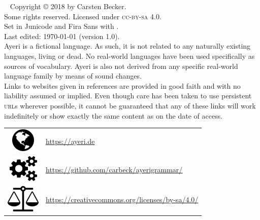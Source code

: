~\vfill
\begingroup
\setlength\parindent{0pt}\footnotesize
Copyright © 2018 by Carsten Becker.\\
Some rights reserved. Licensed under \textsc{cc-by-sa} 4.0.\\

Set in Junicode and {\sffamily Fira Sans} with \XeLaTeX{}.\\
Last edited: \today{} (version 1.0).\\

Ayeri is a fictional language. As such, it is not related to any naturally
existing languages, living or dead. No real-world languages have been used
specifically as sources of vocabulary. Ayeri is also not derived from any
specific real-world language family by means of sound changes.\\

Links to websites given in references are provided in good faith and with no
liability assumed or implied. Even though care has been taken to use persistent
\textsc{url}s wherever possible, it cannot be guaranteed that any of these
links will work indefinitely or show exactly the same content as on the date of
access.\\

\begin{tabular}{@{} c @{\enspace} l}
\includegraphics[scale=.8]{images/faicon-globe-300dpi.png}
& \href{https://ayeri.de}{https://ayeri.de}\\
\includegraphics[scale=.8]{images/faicon-cogs-300dpi.png}
& \href{https://github.com/carbeck/ayerigrammar}
	{https://github.com/carbeck/ayerigrammar/}\\
\includegraphics[scale=.8]{images/faicon-balance-scale-300dpi.png}
& \href{https://creativecommons.org/licenses/by-sa/4.0/}%
	{https://creativecommons.org/licenses/by-sa/4.0/}%
\end{tabular}
\endgroup
